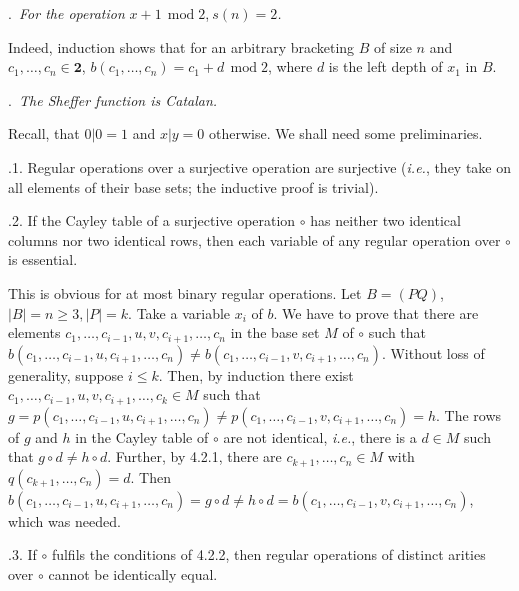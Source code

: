 \documentclass[a4paper,reqno]{amsart}\usepackage{amssymb,latexsym}
\theoremstyle{definition}
\theoremstyle{remark}
\numberwithin{equation}{section}
\numberwithin{theorem}{section}
\begin{document}
.\textit{\ For the operation }$x+1\,\operatorname{mod}2$,$~s(n)=2$\textit{.}

\smallskip

Indeed, induction shows that for an arbitrary bracketing $B$ of size $n$ and
$\allowbreak c_{1},\ldots,c_{n}\in\mathbf{2}$, $b(c_{1},\ldots,c_{n})=c_{1}+d\,\operatorname{mod}2$, where $d$ is the left depth of $x_{1}$ in $B$.

\bigskip

.\textit{\ The Sheffer function is Catalan.}

\smallskip

Recall, that $0|0=1$ and $x|y=0$ otherwise. We shall need some preliminaries.

\smallskip

.1. Regular operations over a surjective operation are surjective
(\textit{i.e.}, they take on all elements of their base sets; the inductive
proof is trivial).

\smallskip

.2. If the Cayley table of a surjective operation $\circ$ has
neither two identical columns nor two identical rows, then each variable of
any regular operation over $\circ$ is essential.

\smallskip

This is obvious for at most binary regular operations. Let $B=(PQ)$,
$|B|=n\geq3,|P|=k$. Take a variable $x_{i}$ of $b$. We have to prove that
there are elements $c_{1},\ldots,c_{i-1},u,v,c_{i+1},\ldots,c_{n}$ in the base
set $M$ of $\circ$ such that $b(c_{1},\ldots,c_{i-1},u,c_{i+1},\allowbreak
\ldots,c_{n})\neq b(c_{1},\ldots,c_{i-1},v,c_{i+1},\ldots,c_{n})$. Without
loss of generality, suppose $i\leq k$. Then, by induction there exist
$c_{1},\ldots,c_{i-1},u,v,c_{i+1},\ldots,c_{k}\in M$ such that $g=p(c_{1},\ldots,c_{i-1},u,c_{i+1},\ldots,c_{n})\neq p(c_{1},\ldots,c_{i-1},v,c_{i+1},\ldots,c_{n})=h$. The rows of $g$ and $h$ in the Cayley table of
$\circ$ are not identical, \textit{i.e.}, there is a $d\in M$ such that
$g\circ d\neq h\circ d$. Further, by 4.2.1, there are $c_{k+1},\ldots,c_{n}\in
M$ with $q(c_{k+1},\ldots,c_{n})=d$. Then $b(c_{1},\ldots,c_{i-1},u,c_{i+1},\ldots,c_{n})=g\circ d\neq h\circ d=b(c_{1},\ldots,c_{i-1},v,c_{i+1},\ldots,c_{n})$, which was needed.

\smallskip

.3. If $\circ$ fulfils the conditions of 4.2.2, then regular
operations of distinct arities over $\circ$ cannot be identically equal.
\end{document}
